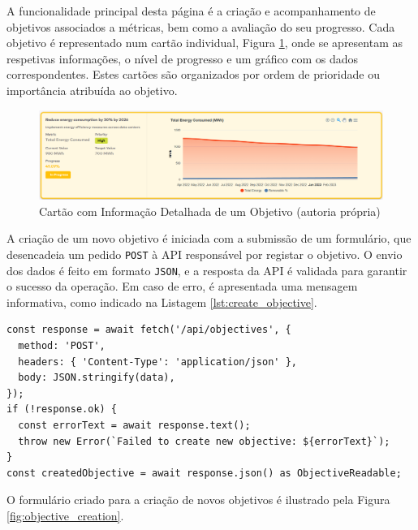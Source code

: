 A funcionalidade principal desta página é a criação e acompanhamento de objetivos associados a métricas, bem como a avaliação do seu progresso. Cada objetivo é representado num cartão individual, Figura \ref{fig:objective_card}, onde se apresentam as respetivas informações, o nível de progresso e um gráfico com os dados correspondentes. Estes cartões são organizados por ordem de prioridade ou importância atribuída ao objetivo.

\begin{figure}[H]
    \centering
    \includegraphics[width=\linewidth,keepaspectratio]{frontmatter/assets/platform_prints/objetives/objective_card.png}
    \caption{Cartão com Informação Detalhada de um Objetivo (autoria própria)}
    \label{fig:objective_card}
\end{figure}

A criação de um novo objetivo é iniciada com a submissão de um formulário, que desencadeia um pedido \texttt{POST} à API responsável por registar o objetivo. O envio dos dados é feito em formato \texttt{JSON}, e a resposta da API é validada para garantir o sucesso da operação. Em caso de erro, é apresentada uma mensagem informativa, como indicado na Listagem \ref{lst:create_objective}.

\begin{lstlisting}[style=customts, caption={Pedido \texttt{POST} para criar um novo Objetivo}, label={lst:create_objective}]
const response = await fetch('/api/objectives', {
  method: 'POST',
  headers: { 'Content-Type': 'application/json' },
  body: JSON.stringify(data),
});
if (!response.ok) {
  const errorText = await response.text();
  throw new Error(`Failed to create new objective: ${errorText}`);
}
const createdObjective = await response.json() as ObjectiveReadable;
\end{lstlisting}

O formulário criado para a criação de novos objetivos é ilustrado pela Figura \ref{fig:objective_creation}.

